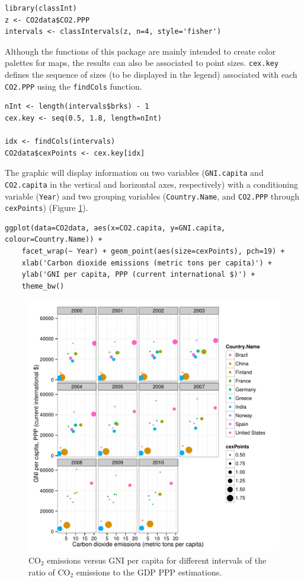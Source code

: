 \documentclass[smallroyalvopaper]{memoir}
\begin{document}
\lstset{language=R,numbers=none}
\begin{lstlisting}
library(classInt)
z <- CO2data$CO2.PPP
intervals <- classIntervals(z, n=4, style='fisher')
\end{lstlisting}

Although the functions of this package are mainly intended to create
color palettes for maps, the results can also be associated to
point sizes. \texttt{cex.key} defines the sequence of sizes (to be
displayed in the legend) associated with each \texttt{CO2.PPP} using the
\texttt{findCols} function.
\lstset{language=R,numbers=none}
\begin{lstlisting}
nInt <- length(intervals$brks) - 1
cex.key <- seq(0.5, 1.8, length=nInt)

idx <- findCols(intervals)
CO2data$cexPoints <- cex.key[idx]
\end{lstlisting}

The graphic will display information on two variables (\texttt{GNI.capita}
and \texttt{CO2.capita} in the vertical and horizontal axes, respectively)
with a conditioning variable (\texttt{Year}) and two grouping variables
(\texttt{Country.Name}, and \texttt{CO2.PPP} through \texttt{cexPoints}) (Figure
\ref{fig:CO2pointsGG}).

\lstset{language=R,numbers=none}
\begin{lstlisting}
ggplot(data=CO2data, aes(x=CO2.capita, y=GNI.capita, colour=Country.Name)) +
    facet_wrap(~ Year) + geom_point(aes(size=cexPoints), pch=19) +
    xlab('Carbon dioxide emissions (metric tons per capita)') +
    ylab('GNI per capita, PPP (current international $)') +
    theme_bw()
\end{lstlisting}

\begin{figure}[htb]
\centering
\includegraphics[width=.9\linewidth]{figs/CO2pointsGG.pdf}
\caption{\label{fig:CO2pointsGG}$\mathrm{CO_2}$ emissions versus GNI per capita for different intervals of the ratio of $\mathrm{CO_2}$ emissions to the GDP PPP estimations.}
\end{figure}
\end{document}
